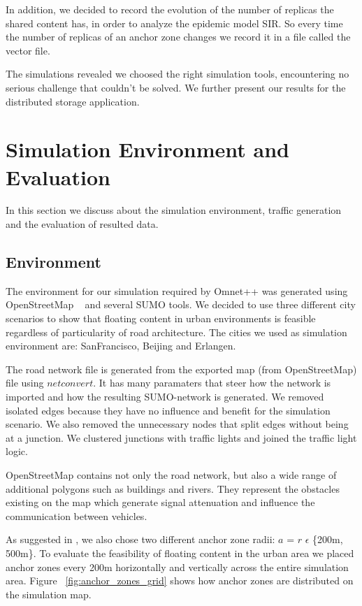 In addition, we decided to record the evolution of the number of replicas the
shared content has, in order to analyze the epidemic model SIR. So every time
the number of replicas of an anchor zone changes we record it in a file called
the vector file.

The simulations revealed we choosed the right simulation tools, encountering no
serious challenge that couldn't be solved. We further present our results for
the distributed storage application.
 

\chapter{Simulation Environment and Evaluation}

In this section we discuss about the simulation environment, traffic
generation and the evaluation of resulted data.

\section{Environment}

The environment for our simulation required by Omnet++ was generated using
OpenStreetMap ~\cite{openstreetmap} and several SUMO tools. We decided to use
three different city scenarios to show that floating content in urban
environments is feasible regardless of particularity of road architecture. The
cities we used as simulation environment are: SanFrancisco, Beijing and Erlangen.

The road network file is generated from the exported map (from OpenStreetMap)
file using $netconvert$. It has many paramaters that steer how the network is
imported and how the resulting SUMO-network is generated. We removed
isolated edges because they have no influence and benefit for the simulation
scenario. We also removed the unnecessary nodes that split edges without being
at a junction. We clustered junctions with traffic lights and joined the traffic
light logic.

OpenStreetMap contains not only the road network, but also a wide range of
additional polygons such as buildings and rivers. They represent the obstacles
existing on the map which generate signal attenuation and influence the
communication between vehicles.

As suggested in \cite{percomfloatingcontent}, we also chose two different anchor
zone radii: $a$ = $r$ $\epsilon$ \{200m, 500m\}. To evaluate the feasibility of
floating content in the urban area we placed anchor zones every 200m
horizontally and vertically across the entire simulation area. Figure
~\ref{fig:anchor_zones_grid} shows how anchor zones are distributed on the
simulation map.

